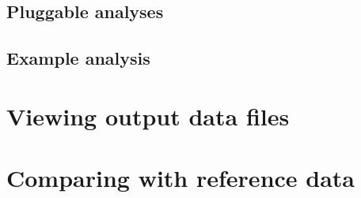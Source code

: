 \documentclass{JHEP3}
\begin{document}
\subsection{Pluggable analyses}
\subsection{Example analysis}

\section{Viewing output data files}

\section{Comparing with reference data}


\end{document}

